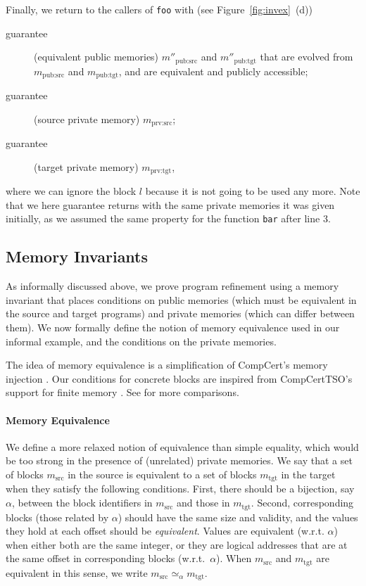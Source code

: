 Finally, we return to the callers of \texttt{foo} with (see Figure~\ref{fig:invex}~(d))
\begin{description}
\item[guarantee] (equivalent public memories) 
  $m''_\textrm{pub:src}$ and $m''_\textrm{pub:tgt}$
  that are evolved from $m_\textrm{pub:src}$ and $m_\textrm{pub:tgt}$,
  and are equivalent and publicly accessible;
\item[guarantee] (source private memory) 
  $m_\textrm{prv:src}$;
\item[guarantee] (target private memory) 
  $m_\textrm{prv:tgt}$,
\end{description}
where we can ignore the block $l$ because it is not going to be used any more.
Note that we here guarantee  returns with the same private memories it was given
initially, as we assumed the same property for the function
\texttt{bar} after line 3.

\subsection{Memory Invariants}
\label{reasoning:invariants}

As informally discussed above, we prove program refinement using a memory invariant that places conditions on
public memories (which must be equivalent in the source and target programs) and private memories (which can differ between them).  We now formally define the
notion of memory equivalence used in our informal
example, and the conditions on the private memories.

The idea of memory equivalence is a simplification of CompCert's
memory injection \cite{Leroy-Appel-Blazy-Stewart-memory-v2}.  Our
conditions for concrete blocks are inspired from CompCertTSO's support
for finite memory \cite{vsevvcik2013compcerttso}.  See
 for more comparisons.


\paragraph{Memory Equivalence}
We define a more relaxed notion of equivalence than simple equality,
which would be too strong in the presence of (unrelated) private
memories. We say that a set of blocks $m_\textrm{src}$ in the source
is equivalent to a set of blocks $m_\textrm{tgt}$ in the target
when they satisfy the following conditions. First, there should be a
bijection, say $\alpha$, between the block identifiers in
$m_\textrm{src}$ and those in $m_\textrm{tgt}$. Second, corresponding
blocks (\ie those related by $\alpha$) should have the same
size and validity, and the values they hold at each offset should be \emph{equivalent}.  Values are
equivalent (w.r.t. $\alpha$) when either both are the same integer, or
they are logical addresses that are at the same offset in corresponding blocks
(w.r.t.~$\alpha$). When $m_\textrm{src}$ and $m_\textrm{tgt}$ are equivalent in this sense, we write $m_\textrm{src} \simeq_\alpha m_\textrm{tgt}$.


